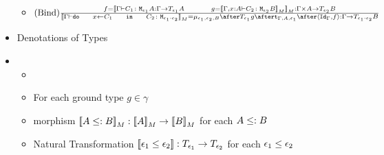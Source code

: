 \documentclass{report}
\begin{document}
\begin{itemize}
\begin{itemize}
        \item $\treerule{Bind}{f = \deno{\typerelation{\G}{C_1}{\M{\e_1}{A}} : \G \rightarrow \T{\e_1}{A}\s\s g = \deno{\typerelation{\gax}{C_2}{\M{\e_2}{B}}}}: \G \times A \rightarrow \T{\e_2}{B}}{\deno{\typerelation{\G}{\doin{x}{C_1}{C_2}}{\M{\e_1 \dot \e_2}}} = \bind{\e_1}{\e_2}{B} \after \T{\e_1}{g} \after \tstrength{\G}{A}{\e_1} \after \pr{\Id{\G}}{f}: \G \rightarrow \T{\e_1 \dot \e_2}{B}}$
    \end{itemize}
    \item Denotations of Types
    \item \begin{itemize}
        \item  {}
        \item For each ground type $g \in \gamma$
        \item morphism ${\bf [\![}A \leq: B{\bf ]\!]}_M : {\bf [\![}A{\bf ]\!]}_M \rightarrow {\bf [\![}B{\bf ]\!]}_M$ for each $A \leq: B$
        \item Natural Transformation ${\bf [\![}\epsilon_1 \leq \epsilon_2{\bf ]\!]}: T_{\epsilon_1}{} \rightarrow T_{\epsilon_2}{}$ for each $\epsilon_1 \leq \epsilon_2$
    \end{itemize}
    
\end{itemize}
    
\end{document}
